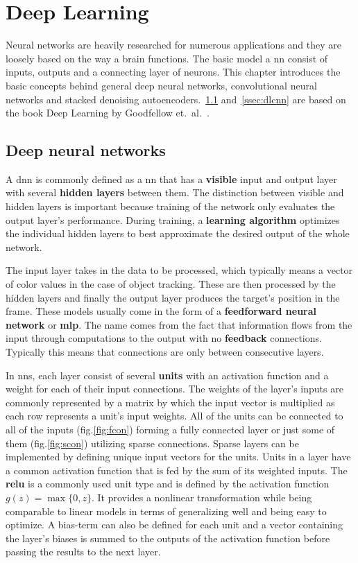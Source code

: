 \section{Deep Learning}
Neural networks are heavily researched for numerous applications and they are loosely
based on the way a brain functions. The basic model a \ac{nn} consist of inputs, outputs
and a connecting layer of neurons. This chapter introduces the basic concepts behind
general deep neural networks, convolutional neural networks and stacked denoising
autoencoders.~\ref{ssec:dldnn} and~\ref{ssec:dlcnn} are based on the book Deep Learning by
Goodfellow et.~al.~\cite{DEEP_LEARNING}.

\subsection{Deep neural networks}\label{ssec:dldnn}

A \ac{dnn} is commonly defined as a \ac{nn} that has a \textbf{visible} input and
output layer with several \textbf{hidden layers} between them. The distinction between
visible and hidden layers is important because training of the network only evaluates
the output layer's performance. During training, a \textbf{learning algorithm} optimizes
the individual hidden layers to best approximate the desired output of the whole network.

The input layer takes in the data to be processed, which typically means a vector of
color values in the case of object tracking. These are then processed by the hidden
layers and finally the output layer produces the target's position in the frame. These
models usually come in the form of a \textbf{feedforward neural network} or
\textbf{\ac{mlp}}. The name comes from the fact that information flows from the input
through computations to the output with no \textbf{feedback} connections. Typically
this means that connections are only between consecutive layers.

In \ac{nn}s, each layer consist of several \textbf{units} with an activation function
and a weight for each of their input connections. The weights of the layer's inputs
are commonly represented by a matrix by which the input vector is multiplied as each
row represents a unit's input weights. All of the units can be connected to all of the
inputs (fig.\ref{fig:fcon}) forming a fully connected layer or just some of them
(fig.\ref{fig:scon}) utilizing sparse connections. Sparse layers can be implemented
by defining unique input vectors for the units. Units in a layer have a common activation
function that is fed by the sum of its weighted inputs. The \textbf{\ac{relu}} is a
commonly used unit type and is defined by the activation function $g (z) = \max\{0,z\}$.
It provides a nonlinear transformation while being comparable to linear models in terms
of generalizing well and being easy to optimize. A bias-term can also be defined for
each unit and a vector containing the layer's biases is summed to the outputs of the
activation function before passing the results to the next layer.

